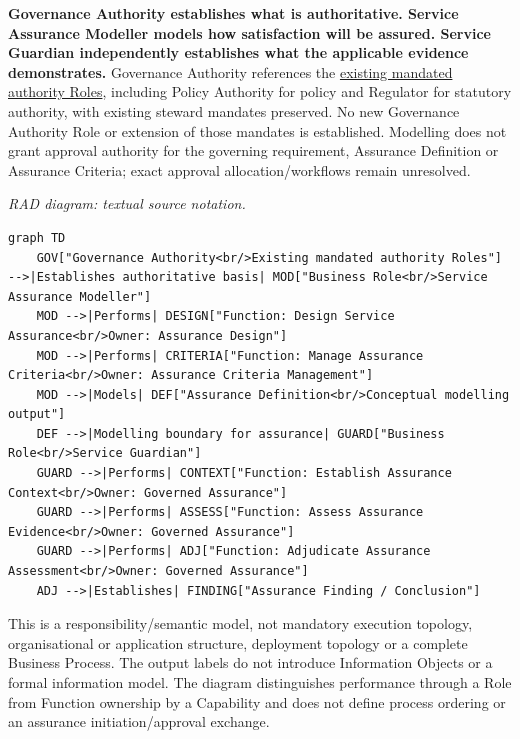 \textbf{Governance Authority establishes what is authoritative. Service Assurance Modeller models how satisfaction will be assured. Service Guardian independently establishes what the applicable evidence demonstrates.} Governance Authority references the \href{https://github.com/fhirfactory/harmonia/blob/98410db60155198a75f74c79d98060070209faa1/docs/markdown/03-business-architecture/actors-roles/roles.md\#37-governance-authority-and-assurance-modelling}{existing mandated authority Roles}, including Policy Authority for policy and Regulator for statutory authority, with existing steward mandates preserved. No new Governance Authority Role or extension of those mandates is established. Modelling does not grant approval authority for the governing requirement, Assurance Definition or Assurance Criteria; exact approval allocation/\allowbreak{}workflows remain unresolved.

\label{rad:assurance:39}

\textit{RAD diagram: textual source notation.}
\begin{Verbatim}[breaklines,fontsize=\footnotesize]
graph TD
    GOV["Governance Authority<br/>Existing mandated authority Roles"] -->|Establishes authoritative basis| MOD["Business Role<br/>Service Assurance Modeller"]
    MOD -->|Performs| DESIGN["Function: Design Service Assurance<br/>Owner: Assurance Design"]
    MOD -->|Performs| CRITERIA["Function: Manage Assurance Criteria<br/>Owner: Assurance Criteria Management"]
    MOD -->|Models| DEF["Assurance Definition<br/>Conceptual modelling output"]
    DEF -->|Modelling boundary for assurance| GUARD["Business Role<br/>Service Guardian"]
    GUARD -->|Performs| CONTEXT["Function: Establish Assurance Context<br/>Owner: Governed Assurance"]
    GUARD -->|Performs| ASSESS["Function: Assess Assurance Evidence<br/>Owner: Governed Assurance"]
    GUARD -->|Performs| ADJ["Function: Adjudicate Assurance Assessment<br/>Owner: Governed Assurance"]
    ADJ -->|Establishes| FINDING["Assurance Finding / Conclusion"]
\end{Verbatim}
\label{rad:assurance:52}

This is a responsibility/\allowbreak{}semantic model, not mandatory execution topology, organisational or application structure, deployment topology or a complete Business Process. The output labels do not introduce Information Objects or a formal information model. The diagram distinguishes performance through a Role from Function ownership by a Capability and does not define process ordering or an assurance initiation/\allowbreak{}approval exchange.

